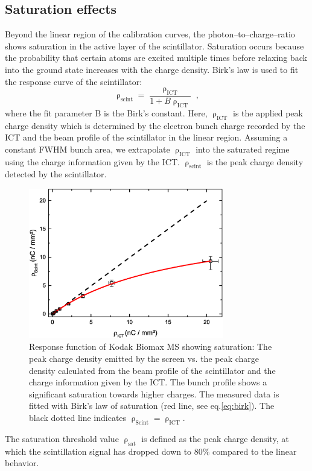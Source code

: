 \documentclass[%
preprint,
amsmath,
amssymb,
aip,
rsi, 
numerical,
floatfix,
]{revtex4-1}
\begin{document}
\subsection{\label{Se}Saturation effects}
Beyond the linear region of the calibration curves, the photon--to--charge--ratio shows saturation in the active layer of the scintillator.
Saturation occurs because the probability that certain atoms are excited multiple times before relaxing back into the ground state increases with the charge density.
Birk’s law is used to fit the response curve of the scintillator:
\begin{equation}
\uprho_{\text{scint}} = \frac{\uprho_{\text{ICT}}}{1+B\uprho_{\text{ICT}}}{\;,}
\label{eq:birk}
\end{equation}
where the fit parameter B is the Birk's constant.
Here, $\uprho_{\text{ICT}}$ is the applied peak charge density which is determined by the electron bunch charge recorded by the ICT and the beam profile of the scintillator in the linear region. 
Assuming a constant FWHM bunch area, we extrapolate $\uprho_{\text{ICT}}$ into the saturated regime using the charge information given by the ICT. 
$\uprho_{\text{scint}}$ is the peak charge density detected by the scintillator.
\begin{figure}
\includegraphics[width=8.5cm]{./Figures/Sat_V2}%
\caption{\label{fig:Sat} Response function of Kodak Biomax MS showing saturation: The peak charge density emitted by the screen vs. the peak charge density calculated from the beam profile of the scintillator and the charge information given by the ICT. 
The bunch profile shows a significant saturation towards higher charges. 
The measured data is fitted with Birk's law of saturation (red line, see eq.\ref{eq:birk}). 
The black dotted line indicates $\uprho_{\text{Scint}} = \uprho_{\text{ICT}}$.}
\end{figure}
The saturation threshold value $\uprho_{\text{sat}}$ is defined as the peak charge density, at which the scintillation signal has dropped down to 80$\%$ compared to the linear behavior.
\end{document}
